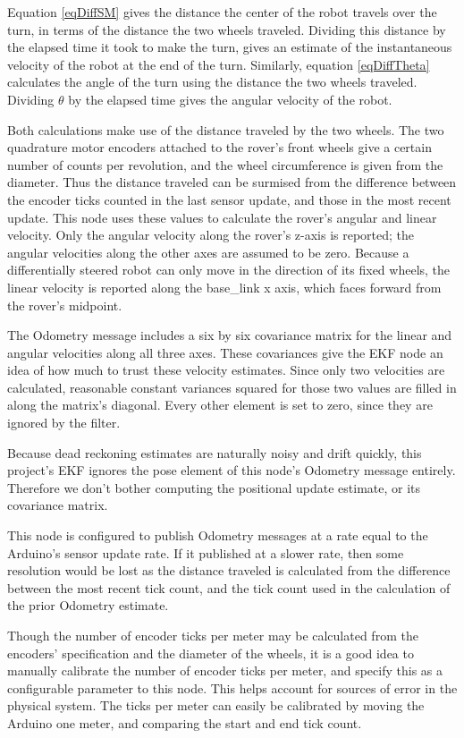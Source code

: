 Equation \ref{eqDiffSM} gives the distance the center of the robot travels over the turn, in terms of the distance the two wheels traveled. Dividing this distance by the elapsed time it took to make the turn, gives an estimate of the instantaneous velocity of the robot at the end of the turn. Similarly, equation \ref{eqDiffTheta} calculates the angle of the turn using the distance the two wheels traveled. Dividing \(\theta\) by the elapsed time gives the angular velocity of the robot.

Both calculations make use of the distance traveled by the two wheels. The two quadrature motor encoders attached to the rover's front wheels give a certain number of counts per revolution, and the wheel circumference is given from the diameter. Thus the distance traveled can be surmised from the difference between the encoder ticks counted in the last sensor update, and those in the most recent update. This node uses these values to calculate the rover's angular and linear velocity. Only the angular velocity along the rover's z-axis is reported; the angular velocities along the other axes are assumed to be zero. Because a differentially steered robot can only move in the direction of its fixed wheels, the linear velocity is reported along the base\_link x axis, which faces forward from the rover's midpoint.

The Odometry message includes a six by six covariance matrix for the linear and angular velocities along all three axes. These covariances give the EKF node an idea of how much to trust these velocity estimates. Since only two velocities are calculated, reasonable constant variances squared for those two values are filled in along the matrix's diagonal. Every other element is set to zero, since they are ignored by the filter. 

Because dead reckoning estimates are naturally noisy and drift quickly, this project's EKF ignores the pose element of this node's Odometry message entirely. Therefore we don't bother computing the positional update estimate, or its covariance matrix.

This node is configured to publish Odometry messages at a rate equal to the Arduino's sensor update rate. If it published at a slower rate, then some resolution would be lost as the distance traveled is calculated from the difference between the most recent tick count, and the tick count used in the calculation of the prior Odometry estimate.

Though the number of encoder ticks per meter may be calculated from the encoders' specification and the diameter of the wheels, it is a good idea to manually calibrate the number of encoder ticks per meter, and specify this as a configurable parameter to this node. This helps account for sources of error in the physical system. The ticks per meter can easily be calibrated by moving the Arduino one meter, and comparing the start and end tick count.

